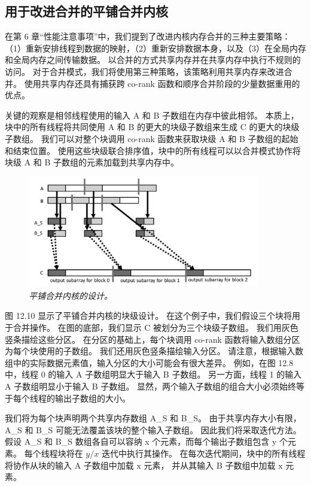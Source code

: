 \subsection{用于改进合并的平铺合并内核}
在第 6 章“性能注意事项”中，我们提到了改进内核内存合并的三种主要策略：
（1）重新安排线程到数据的映射，（2）重新安排数据本身，以及（3）在全局内存和全局内存之间传输数据。 
以合并的方式共享内存并在共享内存中执行不规则的访问。 对于合并模式，我们将使用第三种策略，该策略利用共享内存来改进合并。 
使用共享内存还具有捕获跨 co-rank 函数和顺序合并阶段的少量数据重用的优点。

关键的观察是相邻线程使用的输入 A 和 B 子数组在内存中彼此相邻。 
本质上，块中的所有线程将共同使用 A 和 B 的更大的块级子数组来生成 $\mathrm{C}$ 的更大的块级子数组。 
我们可以对整个块调用 co-rank 函数来获取块级 A 和 B 子数组的起始和结束位置。 
使用这些块级联合排序值，块中的所有线程可以以合并模式协作将块级 A 和 B 子数组的元素加载到共享内存中。

\begin{figure}[H]
	\centering
	\includegraphics[width=0.9\textwidth]{figs/F12.10.png}
	\caption{\textit{平铺合并内核的设计。}}
\end{figure}

图 12.10 显示了平铺合并内核的块级设计。 在这个例子中，我们假设三个块将用于合并操作。 
在图的底部，我们显示 $\mathrm{C}$ 被划分为三个块级子数组。 我们用灰色竖条描绘这些分区。 
在分区的基础上，每个块调用 co-rank 函数将输入数组分区为每个块使用的子数组。 我们还用灰色竖条描绘输入分区。 
请注意，根据输入数组中的实际数据元素值，输入分区的大小可能会有很大差异。 
例如，在图 12.8 中，线程 0 的输入 A 子数组明显大于输入 B 子数组。 
另一方面，线程 1 的输入 A 子数组明显小于输入 B 子数组。
显然，两个输入子数组的组合大小必须始终等于每个线程的输出子数组的大小。

我们将为每个块声明两个共享内存数组 A\_S 和 B\_S。 
由于共享内存大小有限，A\_S 和 B\_S 可能无法覆盖该块的整个输入子数组。 
因此我们将采取迭代方法。 假设 A\_S 和 B\_S 数组各自可以容纳 x 个元素，而每个输出子数组包含 y 个元素。 
每个线程块将在 $y / x$ 迭代中执行其操作。 
在每次迭代期间，块中的所有线程将协作从块的输入 A 子数组中加载 $\mathrm{x}$ 元素，
并从其输入 B 子数组中加载 $\mathrm{x}$ 元素。

